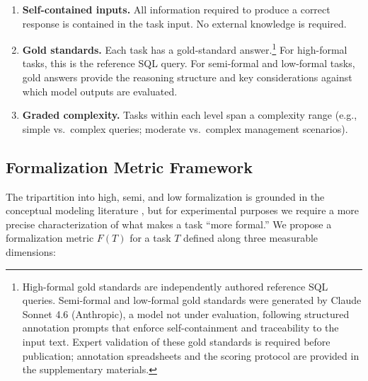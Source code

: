 \documentclass[runningheads]{llncs}
\begin{document}
\begin{enumerate}[noitemsep]
  \item \textbf{Self-contained inputs.} All information required to produce a correct response is contained in the task input. No external knowledge is required.
  \item \textbf{Gold standards.} Each task has a gold-standard answer.\footnote{High-formal gold standards are independently authored reference SQL queries. Semi-formal and low-formal gold standards were generated by Claude Sonnet 4.6 (Anthropic), a model not under evaluation, following structured annotation prompts that enforce self-containment and traceability to the input text. Expert validation of these gold standards is required before publication; annotation spreadsheets and the scoring protocol are provided in the supplementary materials.} For high-formal tasks, this is the reference SQL query. For semi-formal and low-formal tasks, gold answers provide the reasoning structure and key considerations against which model outputs are evaluated.
  \item \textbf{Graded complexity.} Tasks within each level span a complexity range (e.g., simple vs.\ complex queries; moderate vs.\ complex management scenarios).
\end{enumerate}

\subsection{Formalization Metric Framework}
\label{sec:formalization-metric}

The tripartition into high, semi, and low formalization is grounded in the conceptual modeling literature \cite{mylopoulos1992conceptual}, but for experimental purposes we require a more precise characterization of what makes a task ``more formal.'' We propose a formalization metric $F(T)$ for a task $T$ defined along three measurable dimensions:
\end{document}
